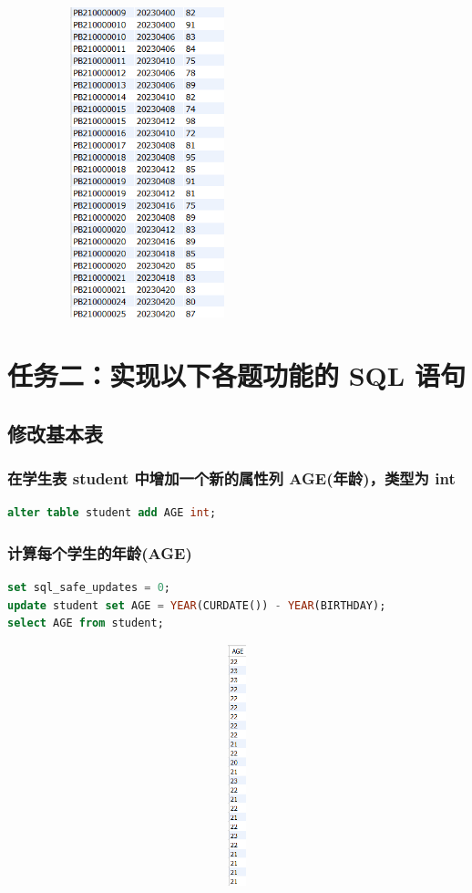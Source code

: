 \documentclass{ctexart}
\begin{document}
					\begin{figure}[H]
						\centering 
						\includegraphics[height=9cm,width=6cm]{6.png}
						\end{figure}
\section{任务二：实现以下各题功能的 SQL 语句}

\subsection{修改基本表}
\subsubsection{在学生表 student 中增加一个新的属性列 AGE(年龄)，类型为 int}
\begin{lstlisting}[language=sql]
	alter table student add AGE int;  
\end{lstlisting}
\subsubsection{计算每个学生的年龄(AGE)}
\begin{lstlisting}[language=sql]
set sql_safe_updates = 0;  
update student set AGE = YEAR(CURDATE()) - YEAR(BIRTHDAY);  
select AGE from student;  
\end{lstlisting}
\begin{figure}[H]
	\centering 
	\includegraphics[height=7cm,width=14cm]{7.png}
	\end{figure}
\end{document}
